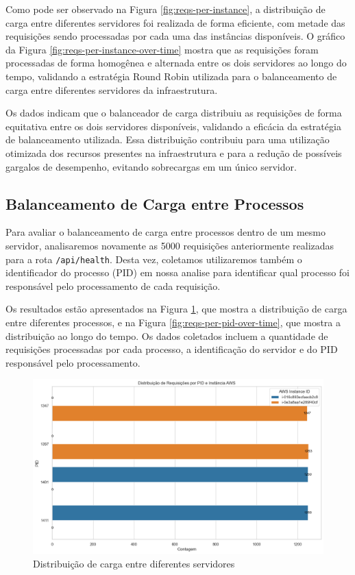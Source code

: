 Como pode ser observado na Figura \ref{fig:reqs-per-instance}, a distribuição de carga entre diferentes servidores foi realizada de forma eficiente, com metade das requisições sendo processadas por cada uma das instâncias disponíveis. O gráfico da Figura \ref{fig:reqs-per-instance-over-time} mostra que as requisições foram processadas de forma homogênea e alternada entre os dois servidores ao longo do tempo, validando a estratégia Round Robin utilizada para o balanceamento de carga entre diferentes servidores da infraestrutura.

Os dados indicam que o balanceador de carga distribuiu as requisições de forma equitativa entre os dois servidores disponíveis, validando a eficácia da estratégia de balanceamento utilizada. Essa distribuição contribuiu para uma utilização otimizada dos recursos presentes na infraestrutura e para a redução de possíveis gargalos de desempenho, evitando sobrecargas em um único servidor.

\subsection{Balanceamento de Carga entre Processos}

Para avaliar o balanceamento de carga entre processos dentro de um mesmo servidor, analisaremos novamente as 5000 requisições anteriormente realizadas para a rota \texttt{/api/health}. Desta vez, coletamos utilizaremos também o identificador do processo (PID) em nossa analise para identificar qual processo foi responsável pelo processamento de cada requisição.

Os resultados estão apresentados na Figura \ref{fig:reqs-per-pid}, que mostra a distribuição de carga entre diferentes processos, e na Figura \ref{fig:reqs-per-pid-over-time}, que mostra a distribuição ao longo do tempo. Os dados coletados incluem a quantidade de requisições processadas por cada processo, a identificação do servidor e do PID responsável pelo processamento.


\begin{figure}[H]
    \centering
    \includegraphics[width=1\textwidth]{assets/balance-test/reqs-per-pid.png}
    \caption{Distribuição de carga entre diferentes servidores}
    \label{fig:reqs-per-pid}
\end{figure}

